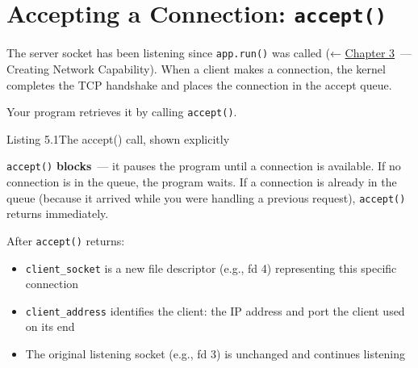 \setcounter{section}{0}
\section{\texorpdfstring{Accepting a Connection: \texttt{accept()}}{Accepting a Connection: accept()}}\label{05-internal-request-execution:51-accepting-a-connection-accept}

The server socket has been listening since \texttt{app.run()} was called (← \hyperref[ch:03-network-capability]{Chapter 3}~--- Creating Network Capability). When a client makes a connection, the kernel completes the TCP handshake and places the connection in the accept queue.

Your program retrieves it by calling \texttt{accept()}.

\begin{codeboxcap}[short]{\textcolor{accent}{Listing 5.1}\enspace The accept() call, shown explicitly}

\begin{Shaded}
\begin{Highlighting}[]

\OperatorTok{=}
\end{Highlighting}
\end{Shaded}

\end{codeboxcap}

\noindent{}\texttt{accept()} \textbf{blocks}~--- it pauses the program until a connection is available. If no connection is in the queue, the program waits. If a connection is already in the queue (because it arrived while you were handling a previous request), \texttt{accept()} returns immediately.

After \texttt{accept()} returns:

\begin{itemize}
\tightlist
\item
  \texttt{client\_socket} is a new file descriptor (e.g., fd 4) representing this specific connection
\item
  \texttt{client\_address} identifies the client: the IP address and port the client used on its end
\item
  The original listening socket (e.g., fd 3) is unchanged and continues listening
\end{itemize}

